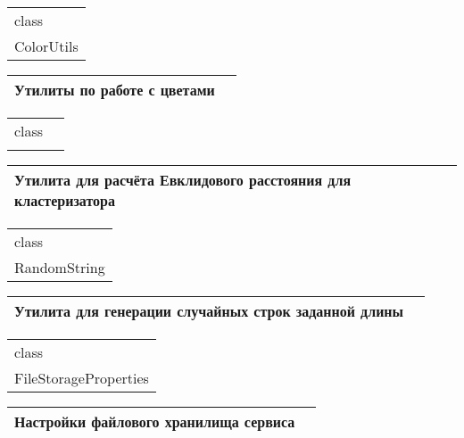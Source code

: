 \begin{table}[H]
\begin{tabular}{|p{8cm} p{8cm}|} 
\hline class &  \\
\multicolumn{2}{|c|}{ColorUtils} \\ \hline
\end{tabular}
\begin{tabular}{|p{8cm}|p{8cm}|} 
  Утилиты по работе с цветами  & \\
\hline 
\end{tabular}
 \label{crc-table-4}
\end{table}

\begin{table}[H]
\begin{tabular}{|p{8cm} p{8cm}|} 
\hline class &  \\
\multicolumn{2}{|c|}{} \\ \hline
\end{tabular}
\begin{tabular}{|p{8cm}|p{8cm}|} 
 Утилита для расчёта Евклидового расстояния для кластеризатора  & \\
\hline 
\end{tabular}
 \label{crc-table-5}
\end{table}

\begin{table}[H]
\begin{tabular}{|p{8cm} p{8cm}|} 
\hline class &  \\
\multicolumn{2}{|c|}{RandomString} \\ \hline
\end{tabular}
\begin{tabular}{|p{8cm}|p{8cm}|} 
  Утилита для генерации случайных строк заданной длины  & \\
\hline 
\end{tabular}
 \label{crc-table-6}
\end{table}

\begin{table}[H]
\begin{tabular}{|p{8cm} p{8cm}|} 
\hline class &  \\
\multicolumn{2}{|c|}{FileStorageProperties} \\ \hline
\end{tabular}
\begin{tabular}{|p{8cm}|p{8cm}|} 
  Настройки файлового хранилища сервиса  & \\
\hline 
\end{tabular}
 \label{crc-table-7}
\end{table}

